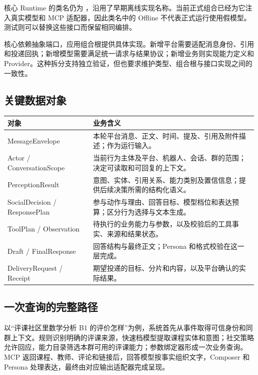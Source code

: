 核心 Runtime 的类名仍为 ，沿用了早期离线实现名称。当前正式组合已经为它注入真实模型和 MCP 适配器，因此类名中的 Offline 不代表正式运行使用假模型。测试则可以替换这些接口而保留相同编排。

\begin{center}
\end{center}
核心依赖抽象端口，应用组合根提供具体实现。新增平台需要适配消息身份、引用和投递回执；新增模型需要满足统一请求与结果协议；新增业务则实现能力定义和 Provider。这种拆分支持独立验证，但也要求维护类型、组合根与接口实现之间的一致性。

\subsection{关键数据对象}
\begin{tabularx}{\textwidth}{@{}L{38mm}Y@{}}\toprule
对象 & 业务含义\\\midrule
MessageEnvelope & 本轮平台消息、正文、时间、提及、引用及附件描述；作为运行输入。\\
Actor / ConversationScope & 当前行为主体及平台、机器人、会话、群的范围；决定可读取和可回复的上下文。\\
PerceptionResult & 意图、实体、引用关系、能力类别及置信信息；提供后续决策所需的结构化语义。\\
SocialDecision / ResponsePlan & 参与动作与理由、回答目标、模型档位和表达预算；区分行为选择与文本生成。\\
ToolPlan / Observation & 待执行的业务能力与参数，以及校验后的工具事实、来源和结果状态。\\
Draft / FinalResponse & 回答结构与最终正文；Persona 和格式校验在这一层完成。\\
DeliveryRequest / Receipt & 期望投递的目标、分片和内容，以及平台确认的实际结果。\\\bottomrule
\end{tabularx}

\subsection{一次查询的完整路径}
以“评课社区里数学分析 B1 的评价怎样”为例，系统首先从事件取得可信身份和同群上下文。规则识别明确的评课来源，快速档模型提取课程实体和意图；社交策略允许回应，能力目录筛选本群可用的评课能力；参数绑定器形成一次业务查询。MCP 返回课程、教师、评论和链接后，回答模型按事实组织文字，Composer 和 Persona 处理表达，最终由对应输出适配器完成呈现。

